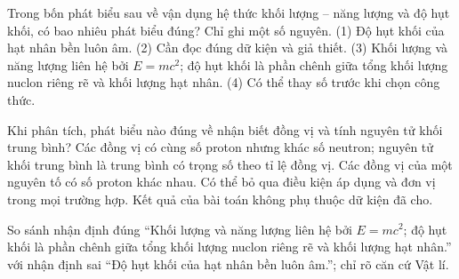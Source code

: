 \begin{ex}
Trong bốn phát biểu sau về vận dụng hệ thức khối lượng – năng lượng và độ hụt khối, có bao nhiêu phát biểu đúng? Chỉ ghi một số nguyên. (1) Độ hụt khối của hạt nhân bền luôn âm. (2) Cần đọc đúng dữ kiện và giả thiết. (3) Khối lượng và năng lượng liên hệ bởi $E=mc^2$; độ hụt khối là phần chênh giữa tổng khối lượng nuclon riêng rẽ và khối lượng hạt nhân. (4) Có thể thay số trước khi chọn công thức.
\end{ex}

\begin{ex}
Khi phân tích, phát biểu nào đúng về nhận biết đồng vị và tính nguyên tử khối trung bình?
\choice
{\True Các đồng vị có cùng số proton nhưng khác số neutron; nguyên tử khối trung bình là trung bình có trọng số theo tỉ lệ đồng vị.}
{Các đồng vị của một nguyên tố có số proton khác nhau.}
{Có thể bỏ qua điều kiện áp dụng và đơn vị trong mọi trường hợp.}
{Kết quả của bài toán không phụ thuộc dữ kiện đã cho.}
\end{ex}

\begin{bt}
So sánh nhận định đúng “Khối lượng và năng lượng liên hệ bởi $E=mc^2$; độ hụt khối là phần chênh giữa tổng khối lượng nuclon riêng rẽ và khối lượng hạt nhân.” với nhận định sai “Độ hụt khối của hạt nhân bền luôn âm.”; chỉ rõ căn cứ Vật lí.
\end{bt}

